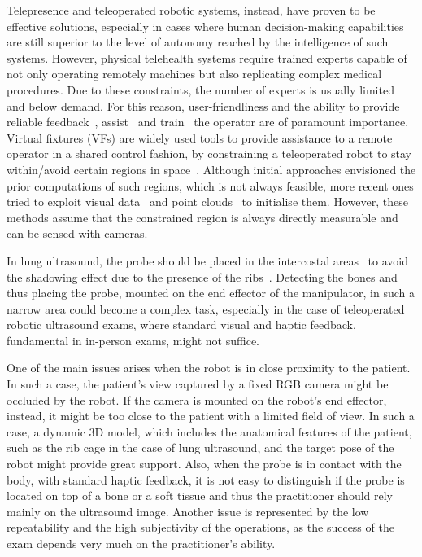 \noindent Telepresence and teleoperated robotic systems, instead, have proven to be effective solutions, especially in cases where human decision-making capabilities are still superior to the level of autonomy reached by the intelligence of such systems.
However, physical telehealth systems require trained experts capable of not only operating remotely machines but also replicating complex medical procedures. Due to these constraints, the number of experts is usually limited and below demand. For this reason, user-friendliness and the ability to provide reliable feedback~\cite{fu2023robot}, assist~\cite{huang2024robot-assisted} and train~\cite{shahbazi2013Dual-user} the operator are of paramount importance.
Virtual fixtures (VFs) are widely used tools to provide assistance to a remote operator in a shared control fashion, by constraining a teleoperated robot to stay within/avoid certain regions in space~\cite{bowyer2014active}.
Although initial approaches envisioned the prior computations of such regions, which is not always feasible, more recent ones tried to exploit visual data~\cite{bettini2004vision,moccia2020vision-based} and point clouds~\cite{ryden2012forbidden} to initialise them. However, these methods assume that the constrained region is always directly measurable and can be sensed with cameras.

\noindent In lung ultrasound, the probe should be placed in the intercostal areas~\cite{Soldati2020ProposalCOVID-19,Demi2023NewUltrasound} to avoid the shadowing effect due to the presence of the ribs~\cite{ogul2016eliminating}. Detecting the bones and thus placing the probe, mounted on the end effector of the manipulator, in such a narrow area could become a complex task, especially in the case of teleoperated robotic ultrasound exams, where standard visual and haptic feedback, fundamental in in-person exams, might not suffice. 

\noindent One of the main issues arises when the robot is in close proximity to the patient. In such a case, the patient's view captured by a fixed RGB camera might be occluded by the robot. If the camera is mounted on the robot's end effector, instead, it might be too close to the patient with a limited field of view. In such a case, a dynamic 3D model, which includes the anatomical features of the patient, such as the rib cage in the case of lung ultrasound, and the target pose of the robot might provide great support. Also, when the probe is in contact with the body, with standard haptic feedback, it is not easy to distinguish if the probe is located on top of a bone or a soft tissue and thus the practitioner should rely mainly on the ultrasound image.
Another issue is represented by the low repeatability and the high subjectivity of the operations, as the success of the exam depends very much on the practitioner's ability.   

